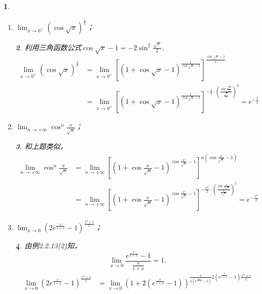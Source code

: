 \documentclass[utf8]{book}
\newtheorem{example}{}[section]             %
\newtheorem{solution}{}
\begin{document}
\begin{example}
\begin{enumerate}
\begin{solution}
\begin{equation*}
\begin{split}
&=e
\end{split}
\end{equation*}
\end{solution}
\item $\displaystyle\lim_{x\to 0^+}\left(\cos{\sqrt{x}}\right)^{\frac{1}{x}}$；
\begin{solution}
利用三角函数公式$\cos{\sqrt{x}}-1 = -2\sin^2{\frac{\sqrt{x}}{2}}$.
\begin{equation*}
\begin{split}
\displaystyle\lim_{x\to 0^+}\left(\cos{\sqrt{x}}\right)^{\frac{1}{x}}&=
\displaystyle\lim_{x\to 0^+}\left[(1+\cos{\sqrt{x}}-1)^{\frac{1}{\cos{\sqrt{x}}-1}}\right]^{\frac{\cos{\sqrt{x}}-1}{x}}\\&=
\displaystyle\lim_{x\to 0^+}\left[(1+\cos{\sqrt{x}}-1)^{\frac{1}{\cos{\sqrt{x}}-1}}\right]^{-\frac{1}{2}\cdot\left(\frac{\sin{\frac{\sqrt{x}}{2}}}{\frac{\sqrt{x}}{2}}\right)^2}=e^{-\frac{1}{2}}
\end{split}
\end{equation*}
\end{solution}
\item $\displaystyle\lim_{n\to +\infty}\cos^n{\frac{x}{\sqrt{n}}}$；
\begin{solution}
和上题类似，
\begin{equation*}
\begin{split}
\displaystyle\lim_{n\to +\infty}\cos^n{\frac{x}{\sqrt{n}}}&=
\displaystyle\lim_{n\to +\infty}\left[(1+\cos{\frac{x}{\sqrt{n}}}-1)^{\cos{\frac{x}{\sqrt{n}}}-1}\right]^{n(\cos{\frac{x}{\sqrt{n}}}-1)}\\&=
\displaystyle\lim_{n\to +\infty}\left[(1+\cos{\frac{x}{\sqrt{n}}}-1)^{\cos{\frac{x}{\sqrt{n}}}-1}\right]^{-\frac{x^2}{2}\cdot\left(\frac{\sin{\frac{x}{2\sqrt{n}}}}{\frac{x}{2\sqrt{n}}}\right)^2}=e^{-\frac{x^2}{2}}
\end{split}
\end{equation*}
\end{solution}
\item $\displaystyle\lim_{x\to 0}(2e^{\frac{x}{1+x}}-1)^{\frac{x^2+1}{x}}$；
\begin{solution}由例2.2.13(2)知，
$$\displaystyle\lim_{x\to 0}\frac{e^{\frac{x}{1+x}}-1}{\frac{x}{1+x}} = 1.$$
\begin{equation*}
\begin{split}
\displaystyle\lim_{x\to 0}(2e^{\frac{x}{1+x}}-1)^{\frac{x^2+1}{x}}
&=\displaystyle\lim_{x\to 0}(1+2(e^{\frac{x}{1+x}}-1))^{\frac{1}{2(e^{\frac{x}{1+x}}-1)}2(e^{\frac{x}{1+x}}-1)\frac{x^2+1}{x}}\\

\end{split}
\end{equation*}
\end{solution}
\end{enumerate}
\end{example}
\end{document}
